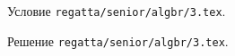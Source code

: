 Условие \texttt{regatta/senior/algbr/3.tex}.

\solution Решение \texttt{regatta/senior/algbr/3.tex}.
